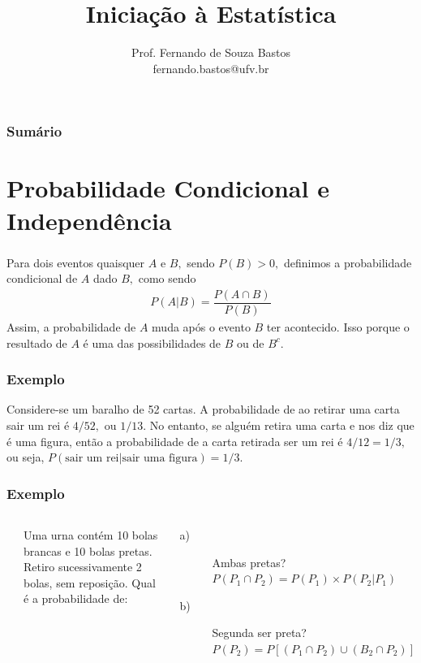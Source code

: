 \documentclass[14pt,aspectratio=1610]{beamer}
\title{Iniciação à Estatística}
\author{Prof. Fernando de Souza Bastos \texorpdfstring{\\ fernando.bastos@ufv.br}{}}
\institute{Departamento de Estatística \texorpdfstring{\\ Universidade Federal de Viçosa}{}\texorpdfstring{\\ Campus UFV - Viçosa}{}}
\date{}
\begin{document}
%

\frame{\titlepage}

\begin{frame}{}
\frametitle{\bf Sumário}
\tableofcontents
\end{frame}

\section{Probabilidade Condicional e Independência}
\begin{frame}{}
\frametitle{}
\begin{block}{}
\justifying
Para dois eventos quaisquer $A$ e $B,$ sendo $P(B)>0,$ definimos a probabilidade
condicional de $A$ dado $B,$ como sendo 
\begin{align}\label{bayes}
P(A|B)=\dfrac{P(A\cap B)}{P(B)}
\end{align}
Assim, a probabilidade de $A$ muda após o evento $B$ ter acontecido. Isso porque o resultado de $A$ é uma das 
possibilidades de $B$ ou de $B^{c}.$ 
\end{block}
\end{frame}


\begin{frame}{}
\frametitle{Exemplo}
\begin{block}{}
\justifying
Considere-se um baralho de 52 cartas. A probabilidade de ao retirar uma
carta sair um rei é $4/52,$ ou $1/13.$ No entanto, se alguém retira uma
carta e nos diz que é uma figura, então a probabilidade de a carta retirada
ser um rei é $4/12=1/3,$ ou seja, $P(\textrm{sair um rei}|\textrm{sair uma
figura})=1/3.$
\end{block}
\end{frame}

\begin{frame}{}
\frametitle{Exemplo}
\begin{block}{}
\begin{columns}
        \column{5cm}
\begin{block}{}
\end{block}
        \column{10cm}
Uma urna contém 10 bolas brancas e 10 bolas pretas. Retiro sucessivamente 2 bolas, sem reposição. Qual é a probabilidade de:
\begin{description}
\item[a)] Ambas pretas?\pause\\
$P(P_{1}\cap P_{2})=P(P_{1})\times P(P_{2}|P_{1})$
\item[b)]Segunda ser preta?\pause\\
$P(P_{2})=P[(P_{1}\cap P_{2})\cup (B_{2}\cap P_{2})]$
\end{description}
\end{columns}
\end{block}     
\end{frame}
\end{document}
